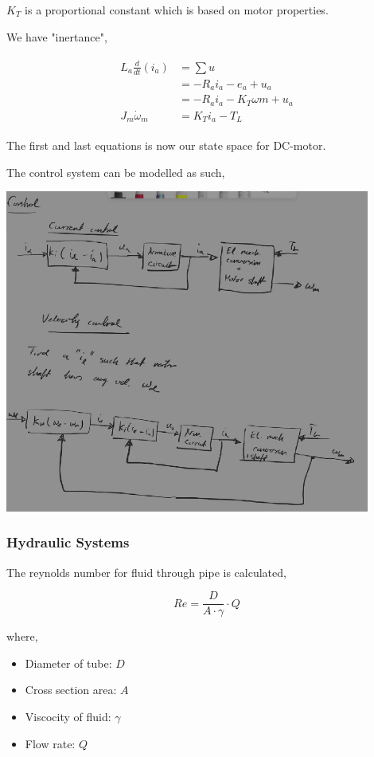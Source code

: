 $K_T$ is a proportional constant which is based on motor properties.

We have "inertance",

\begin{align}
    \begin{split}
        L_a \frac{d}{dt}(i_a) &= \sum u
        \\
        &= -R_ai_a - e_a + u_a
        \\
        &= -R_ai_a - K_T \omega m + u_a
        \\
        J_m\Dot{\omega}_m &= K_Ti_a - T_L
    \end{split}
\end{align}

The first and last equations is now our state space for DC-motor.

The control system can be modelled as such,

\includegraphics[width=12cm]{figures/DCMotor_MODSIM.png}

\subsubsection{Hydraulic Systems}

The reynolds number for fluid through pipe is calculated,

\begin{equation}
    Re = \frac{D}{A\cdot\gamma} \cdot Q
\end{equation}

where,

\begin{itemize}
    \item Diameter of tube: $D$
    \item Cross section area: $A$
    \item Viscocity of fluid: $\gamma$
    \item Flow rate: $Q$
\end{itemize}

